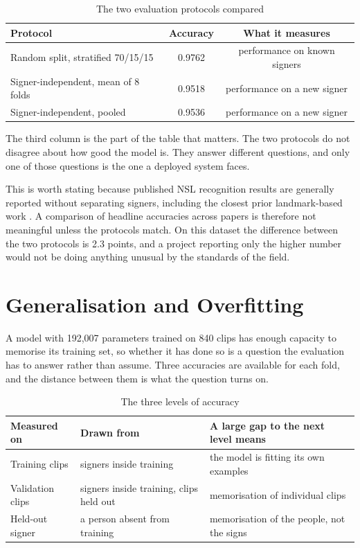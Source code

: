\begin{table}[htbp]
    \centering
    \caption{The two evaluation protocols compared}
    \label{tab:protocols}
    \setlength{\tabcolsep}{3pt}
    \begin{tabular}{lcc}
        \toprule
        \textbf{Protocol} & \textbf{Accuracy} & \textbf{What it measures} \\
        \midrule
        Random split, stratified 70/15/15 & 0.9762 & performance on known signers \\
        Signer-independent, mean of 8 folds & 0.9518 & performance on a new signer \\
        Signer-independent, pooled & 0.9536 & performance on a new signer \\
        \bottomrule
    \end{tabular}
\end{table}

\noindent The third column is the part of the table that matters. The two protocols do not disagree about how good the model is. They answer different questions, and only one of those questions is the one a deployed system faces.

\noindent This is worth stating because published NSL recognition results are generally reported without separating signers, including the closest prior landmark-based work \cite{shrestha2024nsl}. A comparison of headline accuracies across papers is therefore not meaningful unless the protocols match. On this dataset the difference between the two protocols is 2.3 points, and a project reporting only the higher number would not be doing anything unusual by the standards of the field.

\section{Generalisation and Overfitting}
\label{sec:generalisation}

A model with 192{,}007 parameters trained on 840 clips has enough capacity to memorise its
training set, so whether it has done so is a question the evaluation has to answer rather
than assume. Three accuracies are available for each fold, and the distance between them is
what the question turns on.

\begin{table}[htbp]
    \centering
    \caption{The three levels of accuracy}
    \label{tab:threelevels}
    \small
    \begin{tabular}{|p{3.3cm}|p{4.0cm}|p{5.4cm}|}
        \hline
        \textbf{Measured on} & \textbf{Drawn from} & \textbf{A large gap to the next level means} \\
        \hline
        Training clips & signers inside training & the model is fitting its own examples \\
        \hline
        Validation clips & signers inside training, clips held out & memorisation of individual clips \\
        \hline
        Held-out signer & a person absent from training & memorisation of the people, not the signs \\
        \hline
    \end{tabular}
\end{table}

